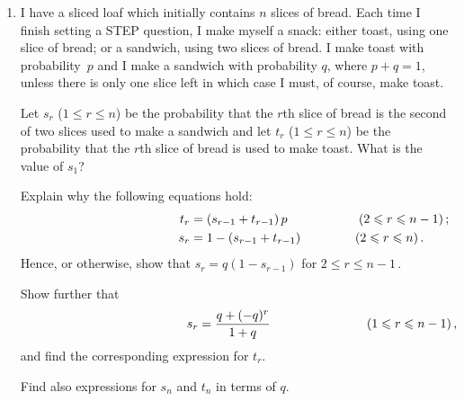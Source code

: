 \documentclass[a4, 11pt]{report}
\newlength{\qspace}
\newcounter{qnumber}
\newenvironment{question}%
 {\vspace{\qspace}
  \begin{enumerate}[\bfseries 1\quad][10]%
    \setcounter{enumi}{\value{qnumber}}%
    \item%
 }
{
  \end{enumerate}
  \filbreak
  \stepcounter{qnumber}
 }
\def\le{\leqslant}
\begin{document}
\vspace{-2mm}


\begin{question}
I have a sliced loaf which initially contains $n$ slices of bread. 
Each time I finish setting a STEP question, I make myself a snack:
either toast, using one slice of bread;
or a sandwich, using two slices of bread. 
I make 
 toast with probability~$p$ and I make a sandwich  
 with probability $q$, where $p+q=1$, 
unless there is only one slice left in which case I must, of course, 
make toast.
 
Let $s_r$ ($1 \le r \le n$) be the probability that 
the $r${th} slice of bread is the second of two slices 
used to make a sandwich 
and  let $t_r$ ($1 \le r \le n$) be the probability that the 
$r${th} slice of bread is used to make toast. What is the value of $s_1$? 

Explain why the following equations hold:
\begin{align*}
\phantom{\hspace{2cm} (2\le r \le n-1)}   
t_r &= (s_{r-1}+ t_{r-1})\,p  
\hspace{2cm}
(2\le r \le n-1)\,;
\\
 \phantom{\hspace{1.53cm} (2\le r \le n) }           
s_r &= 1- (s_{r-1} + t_{r-1})
 \hspace{1.53cm}
( 2\le r \le n )\,.           
\end{align*}
Hence, or otherwise, show that $s_{r} = q(1-s_{r-1})$ for
$2\le r\le n-1$\,.

Show further that 
\[
\phantom{\hspace{2.7cm} (1\le r\le n)\,,}
s_r = \frac{q+(-q)^r}{1+q}
\hspace{2.7cm}
(1\le r\le n-1)\,,
\,
\hspace{0.14cm}
\]
and find the corresponding expression for $t_r$.

Find also expressions for $s_n$ and $t_n$ in terms of $q$.




\end{question}
\end{document}
